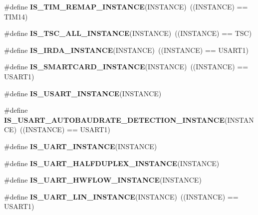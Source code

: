 \begin{DoxyCompactItemize}
\item 
\mbox{\label{group___exported__macro_ga6bb03cf116b07bfe1bd527f8ab61a7f9}} 
\#define {\bfseries I\+S\+\_\+\+T\+I\+M\+\_\+\+R\+E\+M\+A\+P\+\_\+\+I\+N\+S\+T\+A\+N\+CE}(I\+N\+S\+T\+A\+N\+CE)~((I\+N\+S\+T\+A\+N\+CE) == T\+I\+M14)
\item 
\mbox{\label{group___exported__macro_gaf29af2609f6b7748104a965262e95475}} 
\#define {\bfseries I\+S\+\_\+\+T\+S\+C\+\_\+\+A\+L\+L\+\_\+\+I\+N\+S\+T\+A\+N\+CE}(I\+N\+S\+T\+A\+N\+CE)~((I\+N\+S\+T\+A\+N\+CE) == T\+SC)
\item 
\mbox{\label{group___exported__macro_ga98ae6698dc54d8441fce553a65bf5429}} 
\#define {\bfseries I\+S\+\_\+\+I\+R\+D\+A\+\_\+\+I\+N\+S\+T\+A\+N\+CE}(I\+N\+S\+T\+A\+N\+CE)~((I\+N\+S\+T\+A\+N\+CE) == U\+S\+A\+R\+T1)
\item 
\mbox{\label{group___exported__macro_gab2734c105403831749ccb34eeb058988}} 
\#define {\bfseries I\+S\+\_\+\+S\+M\+A\+R\+T\+C\+A\+R\+D\+\_\+\+I\+N\+S\+T\+A\+N\+CE}(I\+N\+S\+T\+A\+N\+CE)~((I\+N\+S\+T\+A\+N\+CE) == U\+S\+A\+R\+T1)
\item 
\#define {\bfseries I\+S\+\_\+\+U\+S\+A\+R\+T\+\_\+\+I\+N\+S\+T\+A\+N\+CE}(I\+N\+S\+T\+A\+N\+CE)
\item 
\mbox{\label{group___exported__macro_ga4130cef42f8cada5a91c38b85f76939e}} 
\#define {\bfseries I\+S\+\_\+\+U\+S\+A\+R\+T\+\_\+\+A\+U\+T\+O\+B\+A\+U\+D\+R\+A\+T\+E\+\_\+\+D\+E\+T\+E\+C\+T\+I\+O\+N\+\_\+\+I\+N\+S\+T\+A\+N\+CE}(I\+N\+S\+T\+A\+N\+CE)~((I\+N\+S\+T\+A\+N\+CE) == U\+S\+A\+R\+T1)
\item 
\#define {\bfseries I\+S\+\_\+\+U\+A\+R\+T\+\_\+\+I\+N\+S\+T\+A\+N\+CE}(I\+N\+S\+T\+A\+N\+CE)
\item 
\#define {\bfseries I\+S\+\_\+\+U\+A\+R\+T\+\_\+\+H\+A\+L\+F\+D\+U\+P\+L\+E\+X\+\_\+\+I\+N\+S\+T\+A\+N\+CE}(I\+N\+S\+T\+A\+N\+CE)
\item 
\#define {\bfseries I\+S\+\_\+\+U\+A\+R\+T\+\_\+\+H\+W\+F\+L\+O\+W\+\_\+\+I\+N\+S\+T\+A\+N\+CE}(I\+N\+S\+T\+A\+N\+CE)
\item 
\mbox{\label{group___exported__macro_ga7d2763df993c77cfa6e249ec7bc80482}} 
\#define {\bfseries I\+S\+\_\+\+U\+A\+R\+T\+\_\+\+L\+I\+N\+\_\+\+I\+N\+S\+T\+A\+N\+CE}(I\+N\+S\+T\+A\+N\+CE)~((I\+N\+S\+T\+A\+N\+CE) == U\+S\+A\+R\+T1)

\end{DoxyCompactItemize}
